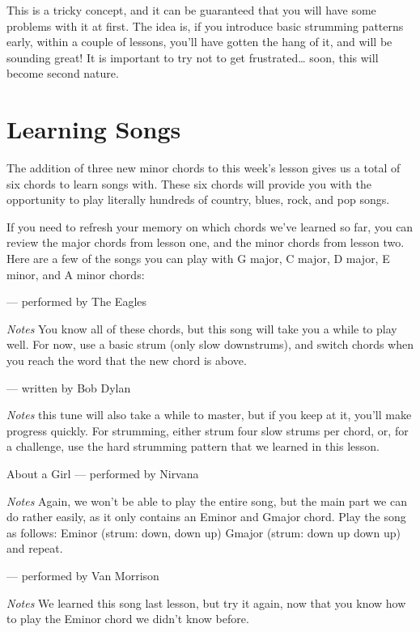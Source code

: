This is a tricky concept, and it can be guaranteed that you will have some
problems with it at first. The idea is, if you introduce basic strumming
patterns early, within a couple of lessons, you'll have gotten the hang of it,
and will be sounding great! It is important to try not to get frustrated\ldots{}
soon, this will become second nature.

\section{Learning Songs}
The addition of three new minor chords to this week's lesson gives us a total
of six chords to learn songs with. These six chords will provide you with the
opportunity to play literally hundreds of country, blues, rock, and pop songs.

If you need to refresh your memory on which chords we've learned so far, you
can review the major chords from lesson one, and the minor chords from lesson
two. Here are a few of the songs you can play with G major, C major, D major, E
minor, and A minor chords:

 --- performed by The Eagles

\emph{Notes} You know all of these chords, but this song will take you a while
to play well. For now, use a basic strum (only slow downstrums), and switch
chords when you reach the word that the new chord is above.

 --- written by Bob Dylan

\emph{Notes} this tune will also take a while to master, but if you keep at it,
you'll make progress quickly. For strumming, either strum four slow strums per
chord, or, for a challenge, use the hard strumming pattern that we learned in
this lesson.

About a Girl --- performed by Nirvana

\emph{Notes} Again, we won't be able to play the entire song, but the main
part we can do rather easily, as it only contains an Eminor and Gmajor chord.
Play the song as follows: Eminor (strum: down, down up) Gmajor (strum: down up
down up) and repeat.

 --- performed by Van Morrison

\emph{Notes} We learned this song last lesson, but try it again, now that you
know how to play the Eminor chord we didn't know before.

